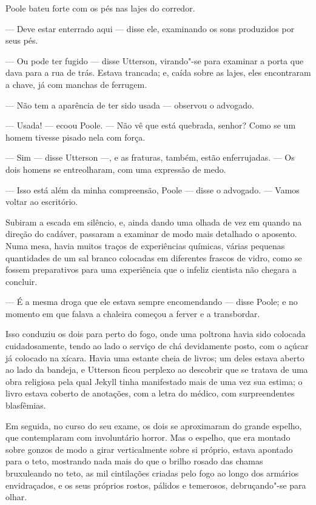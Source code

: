 Poole bateu forte com os pés nas lajes do corredor.

--- Deve estar enterrado aqui --- disse ele, examinando os sons produzidos
por seus pés.

--- Ou pode ter fugido --- disse Utterson, virando"-se para examinar a porta
que dava para a rua de trás.  Estava trancada; e, caída sobre as lajes,
eles encontraram a chave, já com manchas de ferrugem.

--- Não tem a aparência de ter sido usada --- observou o advogado.

--- Usada! --- ecoou Poole. --- Não vê que está quebrada, senhor?  Como se
um homem tivesse pisado nela com força.

--- Sim --- disse Utterson ---, e as fraturas, também, estão enferrujadas. ---
Os dois homens se entreolharam, com uma expressão de medo. 

--- Isso está além da minha compreensão, Poole --- disse o advogado. ---
Vamos voltar ao escritório.

Subiram a escada em silêncio, e, ainda dando uma olhada de vez em quando
na direção do cadáver, passaram a examinar de modo mais detalhado o
aposento.  Numa mesa, havia muitos traços de experiências químicas,
várias pequenas quantidades de um sal branco colocadas em diferentes
frascos de vidro, como se fossem preparativos para uma experiência que
o infeliz cientista não chegara a concluir.

--- É a mesma droga que ele estava sempre encomendando --- disse Poole; e
no momento em que falava a chaleira começou a ferver e a transbordar.

Isso conduziu os dois para perto do fogo, onde uma poltrona havia
sido colocada cuidadosamente, tendo ao lado o serviço de chá devidamente
posto, com o açúcar já colocado na xícara.  Havia uma estante cheia de
livros; um deles estava aberto ao lado da bandeja, e Utterson ficou
perplexo ao descobrir que se tratava de uma obra religiosa pela qual
Jekyll tinha manifestado mais de uma vez sua estima; o livro estava
coberto de anotações, com a letra do médico, com surpreendentes
blasfêmias.

Em seguida, no curso do seu exame, os dois se aproximaram do grande
espelho, que contemplaram com involuntário horror.  Mas o espelho, que
era montado sobre gonzos de modo a girar verticalmente sobre si
próprio, estava apontado para o teto, mostrando nada mais do que o
brilho rosado das chamas bruxuleando no teto, as mil cintilações
criadas pelo fogo ao longo dos armários envidraçados, e os seus
próprios rostos, pálidos e temerosos, debruçando"-se para olhar.

